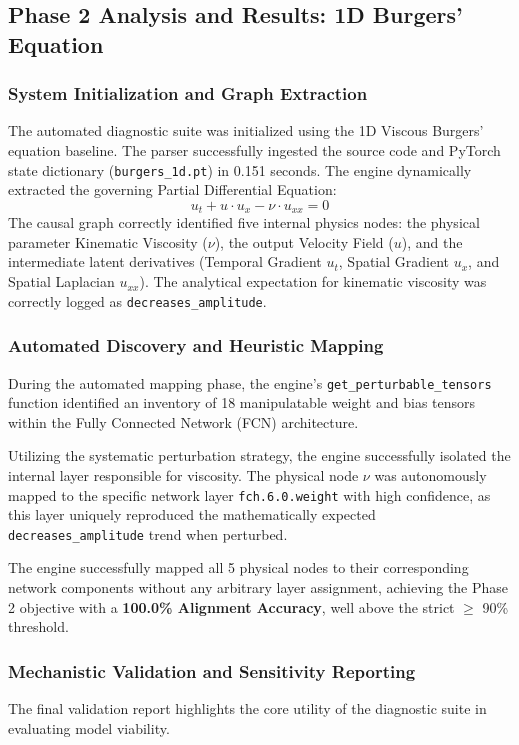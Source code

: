 \documentclass[12pt,singleside,a4paper]{article}
\begin{document}
\subsection{Phase 2 Analysis and Results: 1D Burgers' Equation}

\subsubsection{System Initialization and Graph Extraction}
The automated diagnostic suite was initialized using the 1D Viscous Burgers' equation baseline. The parser successfully ingested the source code and PyTorch state dictionary (\texttt{burgers\_1d.pt}) in 0.151 seconds. The engine dynamically extracted the governing Partial Differential Equation:
\begin{equation}
u_t + u \cdot u_x - \nu \cdot u_{xx} = 0
\end{equation}
The causal graph correctly identified five internal physics nodes: the physical parameter Kinematic Viscosity ($\nu$), the output Velocity Field ($u$), and the intermediate latent derivatives (Temporal Gradient $u_t$, Spatial Gradient $u_x$, and Spatial Laplacian $u_{xx}$). The analytical expectation for kinematic viscosity was correctly logged as \texttt{decreases\_amplitude}.

\subsubsection{Automated Discovery and Heuristic Mapping}
During the automated mapping phase, the engine's \texttt{get\_perturbable\_tensors} function identified an inventory of 18 manipulatable weight and bias tensors within the Fully Connected Network (FCN) architecture. 

Utilizing the systematic perturbation strategy, the engine successfully isolated the internal layer responsible for viscosity. The physical node $\nu$ was autonomously mapped to the specific network layer \texttt{fch.6.0.weight} with high confidence, as this layer uniquely reproduced the mathematically expected \texttt{decreases\_amplitude} trend when perturbed. 

The engine successfully mapped all 5 physical nodes to their corresponding network components without any arbitrary layer assignment, achieving the Phase 2 objective with a \textbf{100.0\% Alignment Accuracy}, well above the strict $\ge$ 90\% threshold.

\subsubsection{Mechanistic Validation and Sensitivity Reporting}
The final validation report highlights the core utility of the diagnostic suite in evaluating model viability. 
\end{document}

